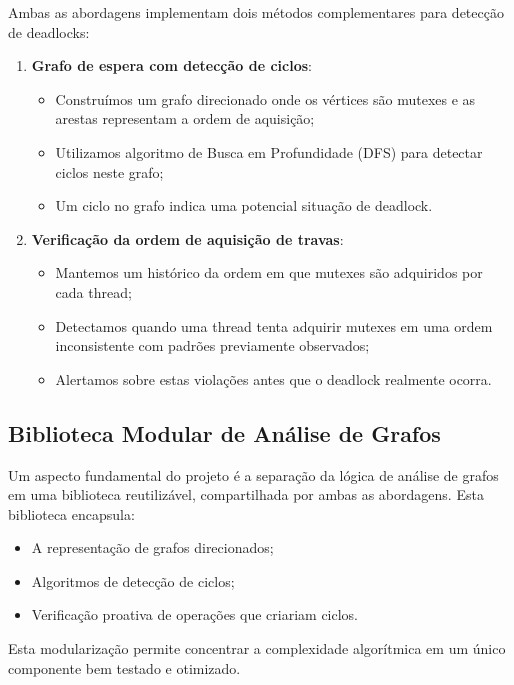 Ambas as abordagens implementam dois métodos complementares para detecção de deadlocks:

\begin{enumerate}
    \item \textbf{Grafo de espera com detecção de ciclos}:
    \begin{itemize}
        \item Construímos um grafo direcionado onde os vértices são mutexes e as arestas representam a ordem de aquisição;
        \item Utilizamos algoritmo de Busca em Profundidade (DFS) para detectar ciclos neste grafo;
        \item Um ciclo no grafo indica uma potencial situação de deadlock.
    \end{itemize}

    \item \textbf{Verificação da ordem de aquisição de travas}:
    \begin{itemize}
        \item Mantemos um histórico da ordem em que mutexes são adquiridos por cada thread;
        \item Detectamos quando uma thread tenta adquirir mutexes em uma ordem inconsistente com padrões previamente observados;
        \item Alertamos sobre estas violações antes que o deadlock realmente ocorra.
    \end{itemize}
\end{enumerate}

\subsection{Biblioteca Modular de Análise de Grafos}

Um aspecto fundamental do projeto é a separação da lógica de análise de grafos em uma biblioteca reutilizável, compartilhada por ambas as abordagens. Esta biblioteca encapsula:

\begin{itemize}
    \item A representação de grafos direcionados;
    \item Algoritmos de detecção de ciclos;
    \item Verificação proativa de operações que criariam ciclos.
\end{itemize}

Esta modularização permite concentrar a complexidade algorítmica em um único componente bem testado e otimizado.


